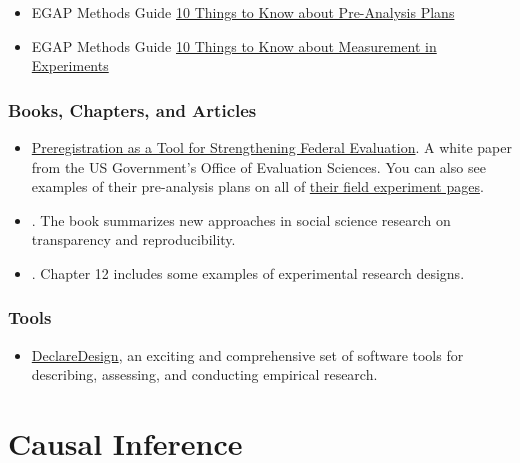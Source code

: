 \documentclass[12pt,]{book}
\providecommand{\tightlist}{%
  \setlength{\itemsep}{0pt}\setlength{\parskip}{0pt}}
\begin{document}
\begin{itemize}
\item
  EGAP Methods Guide \href{https://egap.org/resource/10-things-to-know-about-pre-analysis-plans/}{10 Things to Know about Pre-Analysis Plans}
\item
  EGAP Methods Guide \href{https://egap.org/resource/10-things-to-know-about-measurement-in-experiments/}{10 Things to Know about Measurement in Experiments}
\end{itemize}

\hypertarget{books-chapters-and-articles}{%
\subsection{Books, Chapters, and Articles}\label{books-chapters-and-articles}}

\begin{itemize}
\item
  \href{https://oes.gsa.gov/assets/files/preregistration-as-a-tool-in-federal-evaluation.pdf}{Preregistration as a Tool for Strengthening Federal Evaluation}. A white paper from the US Government's Office of Evaluation Sciences. You can also see examples of their pre-analysis plans on all of \href{https://oes.gsa.gov/work/}{their field experiment pages}.
\item
  \autocite{christensen_transparent_2019}. The book summarizes new approaches in social science research on transparency and reproducibility.
\item
  \autocite{gerber_field_2012}. Chapter 12 includes some examples of experimental research designs.
\end{itemize}

\hypertarget{tools}{%
\subsection{Tools}\label{tools}}

\begin{itemize}
\tightlist
\item
  \href{https://declaredesign.org/}{DeclareDesign}, an exciting and comprehensive set of software tools for describing, assessing, and conducting empirical research.
\end{itemize}

\hypertarget{causal-inference}{%
\chapter{Causal Inference}\label{causal-inference}}
\end{document}
